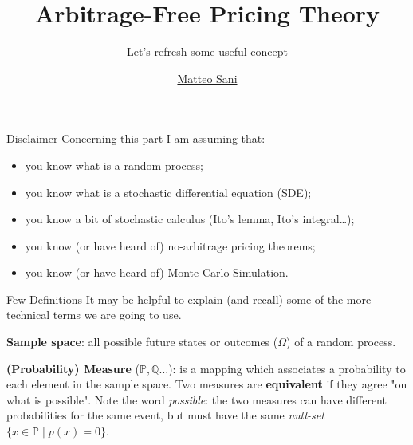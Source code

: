 \documentclass{beamer}
\title{Arbitrage-Free Pricing Theory}
\subtitle{Let's refresh some useful concept}
\author{\href{mailto:matteo.sani@unisi.it}{Matteo Sani}}
\begin{document}
	\begin{frame}[plain]
		\maketitle
	\end{frame}        

\begin{frame}{Disclaimer}
Concerning this part I am assuming that:
\begin{itemize}
\item you know what is a random process;
\item you know what is a stochastic differential equation (SDE);
\item you know a bit of stochastic calculus (Ito's lemma, Ito's integral\ldots);
\item you know (or have heard of) no-arbitrage pricing theorems;
\item you know (or have heard of) Monte Carlo Simulation.
\end{itemize}
\end{frame}	

\begin{frame}{Few Definitions}
		It may be helpful to explain (and recall) some of the more technical terms we are going to use.\newline
		
		\textbf{Sample space}: all possible future states or outcomes ($\Omega$) of a random process.\newline
		
		\textbf{(Probability) Measure} ($\mathbb{P}, \mathbb{Q}\ldots$): is a mapping which associates a probability to each element in the sample space. Two measures are \textbf{equivalent} if they agree "on what is possible". Note the word \emph{possible}: the two measures can have different probabilities for the same event, but must have the same \emph{null-set} $\{x\in {\mathbb{P}}\mid p (x)=0\}$. 
	\end{frame}
\end{document}

